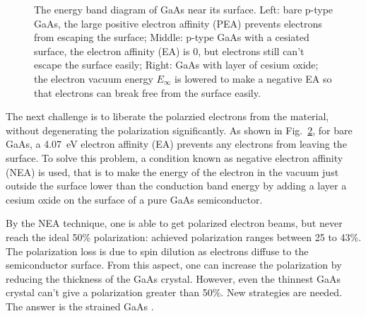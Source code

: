 \begin{figure}[!h]
\begin{subfigure}[b]{0.32\textwidth}
{
	}
	\label{fig:NEA}
    \end{subfigure}
    \caption{The energy band diagram of GaAs near its surface. 
    Left: bare p-type GaAs, the large positive electron affinity (PEA) 
    prevents electrons from escaping the surface; 
    Middle: p-type GaAs with a cesiated surface, the electron affinity (EA)
    is 0, but electrons still can't escape the surface easily; 
    Right: GaAs with layer of cesium oxide; the electron vacuum energy $E_\infty$ is
    lowered to make a negative EA so that electrons can break free from the surface
    easily. \cite{CARDMAN1992317}}
    \label{fig:electron_affinity}
\end{figure}
The next challenge is to liberate the polarzied electrons from the material, without 
degenerating the polarization significantly. As shown in Fig.~\ref{fig:electron_affinity},
for bare GaAs, a 4.07~eV electron affinity (EA) prevents any electrons from
leaving the surface. To solve this problem, a condition known as negative
electron affinity (NEA) is used, that is to make the energy of the electron in 
the vacuum just outside the surface lower than the conduction band energy by
adding a layer a cesium oxide on the surface of a pure GaAs semiconductor.

By the NEA technique, one is able to get polarized electron beams, but never
reach the ideal 50\% polarization: achieved polarization ranges between 25 to 43\%. 
The polarization loss is due to spin dilution as electrons diffuse to the 
semiconductor surface. From this aspect, one can increase the polarization by 
reducing the thickness of the GaAs crystal. However, even the thinnest
GaAs crystal can't give a polarization greater than 50\%. New strategies 
are needed. The answer is the strained GaAs \cite{CARDMAN1992317}.

